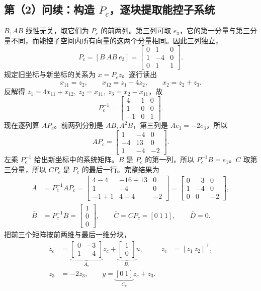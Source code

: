 \subsection{第（2）问续：构造 $P_c$，逐块提取能控子系统}

$B,AB$ 线性无关，取它们为 $P_c$ 的前两列。第三列可取 $e_3$，它的第一分量与第三分量不同，而能控子空间内所有向量的这两个分量相同。因此三列独立，
\[
    P_c=[B\ AB\ e_3]=\begin{bmatrix}0&1&0\\1&-4&0\\0&1&1\end{bmatrix}.
\]
规定旧坐标与新坐标的关系为 $x=P_cz$。逐行读出
\[
    x_{11}=z_2,\qquad
    x_{12}=z_1-4z_2,\qquad
    x_2=z_2+z_3 .
\]
反解得 $z_1=4x_{11}+x_{12},\ z_2=x_{11},\ z_3=x_2-x_{11}$，故
\[
    P_c^{-1}=\begin{bmatrix}4&1&0\\1&0&0\\-1&0&1\end{bmatrix}.
\]
现在逐列算 $AP_c$。前两列分别是 $AB,A^2B$，第三列是 $Ae_3=-2e_3$，所以
\[
    AP_c=\begin{bmatrix}1&-4&0\\-4&13&0\\1&-4&-2\end{bmatrix}.
\]
左乘 $P_c^{-1}$ 给出新坐标中的系统矩阵。$B$ 是 $P_c$ 的第一列，所以 $P_c^{-1}B=e_1$。$C$ 取第三分量，所以 $CP_c$ 是 $P_c$ 的最后一行。完整结果为
\[
\begin{aligned}
   \bar A&=P_c^{-1}AP_c
      =\begin{bmatrix}
        4-4&-16+13&0\\1&-4&0\\-1+1&4-4&-2
      \end{bmatrix}
      =\begin{bmatrix}0&-3&0\\1&-4&0\\0&0&-2\end{bmatrix},\\
   \bar B&=P_c^{-1}B=\begin{bmatrix}1\\0\\0\end{bmatrix},
   \qquad \bar C=CP_c=[0\ 1\ 1],\qquad \bar D=0 .
\end{aligned}
\]
把前三个矩阵按前两维与最后一维分块，
\[
\begin{aligned}
    \dot z_c&=\underbrace{\begin{bmatrix}0&-3\\1&-4\end{bmatrix}}_{A_c}z_c
                   +\underbrace{\begin{bmatrix}1\\0\end{bmatrix}}_{B_c}u,
      &z_c&=[z_1\ z_2]^\top,\\
    \dot z_3&=-2z_3,\qquad
    y=\underbrace{[0\ 1]}_{C_c}z_c+z_3 .
\end{aligned}
\]
